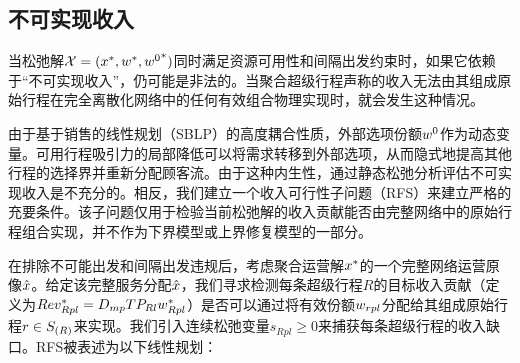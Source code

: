 \subsection{不可实现收入}
当松弛解$\mathcal{X} = (x^*, w^*, {w^0}^*)$同时满足资源可用性和间隔出发约束时，如果它依赖于“不可实现收入”，仍可能是非法的。当聚合超级行程声称的收入无法由其组成原始行程在完全离散化网络中的任何有效组合物理实现时，就会发生这种情况。

由于基于销售的线性规划（SBLP）的高度耦合性质，外部选项份额${w^0}$作为动态变量。可用行程吸引力的局部降低可以将需求转移到外部选项，从而隐式地提高其他行程的选择界并重新分配顾客流。由于这种内生性，通过静态松弛分析评估不可实现收入是不充分的。相反，我们建立一个收入可行性子问题（RFS）来建立严格的充要条件。该子问题仅用于检验当前松弛解的收入贡献能否由完整网络中的原始行程组合实现，并不作为下界模型或上界修复模型的一部分。

在排除不可能出发和间隔出发违规后，考虑聚合运营解$x^*$的一个完整网络运营原像$\hat{x}$。给定该完整服务分配$\hat{x}$，我们寻求检测每条超级行程$R$的目标收入贡献（定义为$Rev_{Rpl}^* = D_{mp} TP_{Rl} w_{Rpl}^*$）是否可以通过将有效份额$w_{rpl}$分配给其组成原始行程$r \in S_{(R)}$来实现。我们引入连续松弛变量$s_{Rpl} \ge 0$来捕获每条超级行程的收入缺口。RFS被表述为以下线性规划：

